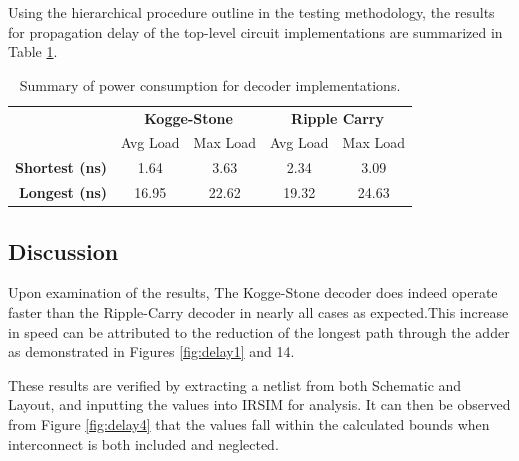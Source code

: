 \documentclass[conference]{IEEEtran}
\begin{document}
Using the hierarchical procedure outline in the testing methodology, the results for propagation delay of the top-level circuit implementations are summarized in Table \ref{tab:delay3}.

\FloatBarrier
\begin{table}[H]
\centering
\caption{Summary of power consumption for decoder implementations.}
\label{tab:delay3}
\begin{tabular}{|r|cc|cc|}
\hline
\multicolumn{1}{|l|}{\cellcolor[HTML]{9B9B9B}{\color[HTML]{9B9B9B} }} & \multicolumn{2}{c|}{\textbf{Kogge-Stone}} & \multicolumn{2}{c|}{\textbf{Ripple Carry}} \\ \cline{2-5} 
\cellcolor[HTML]{9B9B9B}\textbf{}                                     & \multicolumn{1}{c|}{Avg Load}  & Max Load & \multicolumn{1}{c|}{Avg Load}  & Max Load  \\ \hline
\textbf{Shortest (ns)}                                                & 1.64                           & 3.63     & 2.34                           & 3.09      \\ \cline{1-1}
\textbf{Longest (ns)}                                                 & 16.95                          & 22.62    & 19.32                          & 24.63     \\ \hline
\end{tabular}
\end{table}
\FloatBarrier

\subsection{Discussion}

Upon examination of the results, The Kogge-Stone decoder does indeed operate faster than the Ripple-Carry decoder in nearly all cases as expected.This increase in speed can be attributed to the reduction of the longest path through the adder as demonstrated in Figures \ref{fig:delay1} and 14.

These results are verified by extracting a netlist from both Schematic and Layout, and inputting the values into IRSIM for analysis. It can then be observed from Figure \ref{fig:delay4} that the values fall within the calculated bounds when interconnect is both included and neglected.
\end{document}
